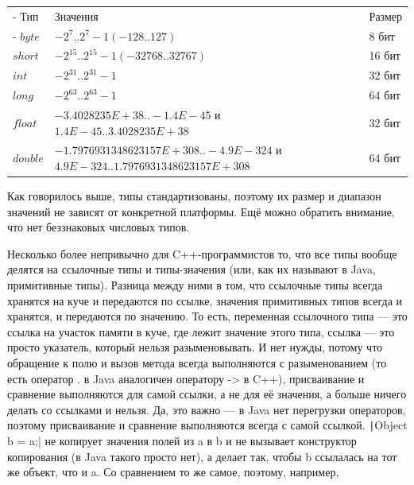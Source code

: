 \documentclass[a5paper]{article}
\begin{document}
\begin{tabu} {| X[0.3 l p] | X[1 l p] | X[0.2 l p] |}
	\tabucline-
	Тип       & Значения                                                                              & Размер  \\
	\tabucline-
	\everyrow{\tabucline-}
	$byte$    & $-2^7..2^7-1 (-128..127)$                                                             & 8 бит   \\
	$short$   & $-2^15..2^15-1 (-32768..32767)$                                                       & 16 бит  \\
	$int$     & $-2^31..2^31-1$                                                                       & 32 бит  \\
	$long$    & $-2^63 .. 2^63-1$                                                                     & 64 бит  \\
	$float$   & $-3.4028235E+38..-1.4E-45$ \newline и $1.4E-45..3.4028235E+38$                        & 32 бит  \\
	$double$  & $-1.7976931348623157E+308..-4.9E-324$ \newline и $4.9E-324..1.7976931348623157E+308$  & 64 бит  \\
\end{tabu}

Как говорилось выше, типы стандартизованы, поэтому их размер и диапазон значений не зависят от конкретной платформы. Ещё можно обратить внимание, что нет беззнаковых числовых типов.

Несколько более непривычно для C++-программистов то, что все типы вообще делятся на ссылочные типы и типы-значения (или, как их называют в Java, примитивные типы). Разница между ними в том, что ссылочные типы всегда хранятся на куче и передаются по ссылке, значения примитивных типов всегда и хранятся, и передаются по значению. То есть, переменная ссылочного типа --- это ссылка на участок памяти в куче, где лежит значение этого типа, ссылка --- это просто указатель, который нельзя разыменовывать. И нет нужды, потому что обращение к полю и вызов метода всегда выполняются с разыменованием (то есть оператор . в Java аналогичен оператору -> в C++), присваивание и сравнение выполняются для самой ссылки, а не для её значения, а больше ничего делать со ссылками и нельзя. Да, это важно --- в Java нет перегрузки операторов, поэтому присваивание и сравнение выполняются всегда с самой ссылкой. \texttt|Object b = a;| не  копирует значения полей из a в b и не вызывает конструктор копирования (в Java такого просто нет), а делает так, чтобы b ссылалась на тот же объект, что и a. Со сравнением то же самое, поэтому, например, 
\end{document}
